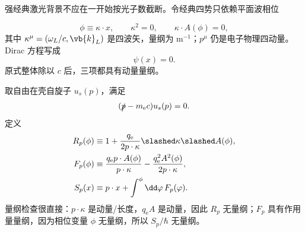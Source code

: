 \begin{derivation}
强经典激光背景不应在一开始按光子数截断。令经典四势只依赖平面波相位

\begin{equation*}
 \phi\equiv\kappa\cdot x,
 \qquad
 \kappa^2=0,
 \qquad
 \kappa\cdot A(\phi)=0,
 \end{equation*}
其中 $\kappa^\mu=(\omega_L/c,\vb{k}_L)$ 是四波矢，量纲为 $\mathrm{m^{-1}}$；$p^\mu$ 仍是电子物理四动量。Dirac 方程写成
\begin{equation*}
 [\ii\hbar\slashed\partial-q_{\mathrm e}\slashed A(\phi)-m_{\mathrm e} c]\psi(x)=0.
 \end{equation*}
原式整体除以 $c$ 后，三项都具有动量量纲。

取自由在壳自旋子 $u_s(p)$，满足
\begin{equation*}
 (\slashed p-m_{\mathrm e} c)u_s(p)=0.
\end{equation*}
定义
\begin{align*}
 R_p(\phi)
 &\equiv
 1+\frac{q_{\mathrm e}}{2p\cdot\kappa}
 \slashed\kappa\slashed A(\phi),\\
 F_p(\phi)
 &\equiv
 \frac{q_{\mathrm e} p\cdot A(\phi)}{p\cdot\kappa}
 -\frac{q_{\mathrm e}^2A^2(\phi)}{2p\cdot\kappa},\\
 S_p(x)
 &\equiv p\cdot x+\int^{\phi}\dd\varphi\,F_p(\varphi).
 \end{align*}
量纲检查很直接：$p\cdot\kappa$ 是动量/长度，$q_{\mathrm e} A$ 是动量，因此 $R_p$ 无量纲；$F_p$ 具有作用量量纲，因为相位变量 $\phi$ 无量纲，所以 $S_p/\hbar$ 无量纲。


\end{derivation}
